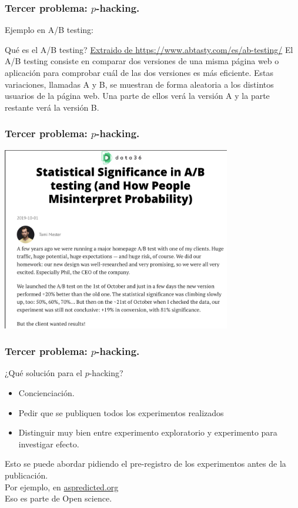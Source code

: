 \documentclass[9pt]{beamer}
\begin{document}
\begin{frame}
  \frametitle{Tercer problema: $p$-hacking.}
    \begin{overlayarea}{\textwidth}{\textheight}
      Ejemplo en A/B testing: \\
      \onslide<+->
      \begin{block}{Qué es el A/B testing? \href{https://www.abtasty.com/es/ab-testing/}{Extraido de https://www.abtasty.com/es/ab-testing/}}
El A/B testing consiste en comparar dos versiones de una misma página web o aplicación para comprobar cuál de las dos versiones es más eficiente. Estas variaciones, llamadas A y B, se muestran de forma aleatoria a los distintos usuarios de la página web. Una parte de ellos verá la versión A y la parte restante verá la versión B.
      \end{block}
\end{overlayarea}
\end{frame}

\begin{frame}
  \frametitle{Tercer problema: $p$-hacking.}
    \begin{overlayarea}{\textwidth}{\textheight}
      \begin{center}
\includegraphics[width=10cm]{images/ab_testing}  
\end{center}
\end{overlayarea}
\end{frame}

\begin{frame}
  \frametitle{Tercer problema: $p$-hacking.}
  ¿Qué solución para el $p$-hacking?\onslide<+->
  \begin{itemize}
  \item<+-> Concienciación.
  \item<+-> Pedir que se publiquen todos los experimentos realizados
  \item<+-> Distinguir muy bien entre experimento exploratorio y
    experimento para investigar efecto.   
  \end{itemize}
  \onslide<+-> Esto se puede abordar pidiendo el pre-registro de los
  experimentos antes de la publicación.\\ 
  \onslide<+-> Por ejemplo, en
  \href{https://aspredicted.org}{aspredicted.org}\\
  \onslide<+-> Eso es parte de Open science.
  
\end{frame}
\end{document}
